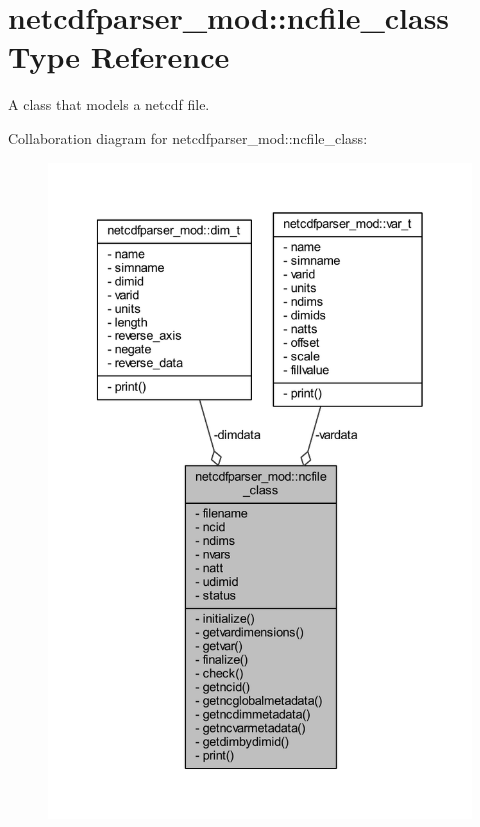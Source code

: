 \hypertarget{structnetcdfparser__mod_1_1ncfile__class}{}\section{netcdfparser\+\_\+mod\+:\+:ncfile\+\_\+class Type Reference}
\label{structnetcdfparser__mod_1_1ncfile__class}


A class that models a netcdf file.  




Collaboration diagram for netcdfparser\+\_\+mod\+:\+:ncfile\+\_\+class\+:\nopagebreak
\begin{figure}[H]
\begin{center}
\leavevmode
\includegraphics[width=342pt]{structnetcdfparser__mod_1_1ncfile__class__coll__graph}
\end{center}
\end{figure}
